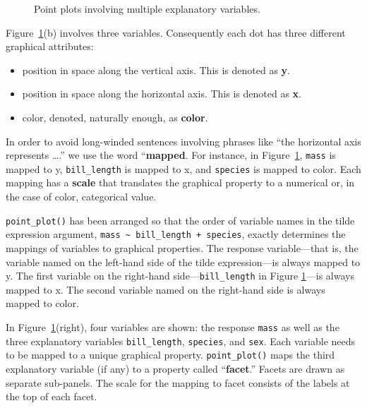 \documentclass[
  letterpaper,
  DIV=11,
  numbers=noendperiod,
  oneside]{scrartcl}
\providecommand{\tightlist}{%
  \setlength{\itemsep}{0pt}\setlength{\parskip}{0pt}}\usepackage{longtable,booktabs,array}
\begin{document}
\begin{figure}
{\begin{figure}[H]
\begin{minipage}{0.50\linewidth}
\end{minipage}%

\end{figure}%

}

\caption{\label{fig-mass-bill-species}Point plots involving multiple
explanatory variables.}

\end{figure}%

Figure~\ref{fig-mass-bill-species}(b) involves three variables.
Consequently each dot has three different graphical attributes:

\begin{itemize}
\tightlist
\item
  position in space along the vertical axis. This is denoted as
  \textbf{y}.
\item
  position in space along the horizontal axis. This is denoted as
  \textbf{x}.
\item
  color, denoted, naturally enough, as \textbf{color}.
\end{itemize}

In order to avoid long-winded sentences involving phrases like ``the
horizontal axis represents \ldots.'' we use the word ``\textbf{mapped}.
For instance, in Figure~\ref{fig-mass-bill-species}, \texttt{mass} is
mapped to y, \texttt{bill\_length} is mapped to x, and \texttt{species}
is mapped to color. Each mapping has a \textbf{scale} that translates
the graphical property to a numerical or, in the case of color,
categorical value.

\texttt{point\_plot()} has been arranged so that the order of variable
names in the tilde expression argument,
\texttt{mass\ \textasciitilde{}\ bill\_length\ +\ species}, exactly
determines the mappings of variables to graphical properties. The
response variable---that is, the variable named on the left-hand side of
the tilde expression---is always mapped to y. The first variable on the
right-hand side---\texttt{bill\_length} in Figure
\ref{fig-mass-bill-species}---is always mapped to x. The second variable
named on the right-hand side is always mapped to color.

In Figure~\ref{fig-mass-bill-species}(right), four variables are shown:
the response \texttt{mass} as well as the three explanatory variables
\texttt{bill\_length}, \texttt{species}, and \texttt{sex}. Each variable
needs to be mapped to a unique graphical property.
\texttt{point\_plot()} maps the third explanatory variable (if any) to a
property called ``\textbf{facet}.'' Facets are drawn as separate
sub-panels. The scale for the mapping to facet consists of the labels at
the top of each facet.
\end{document}

